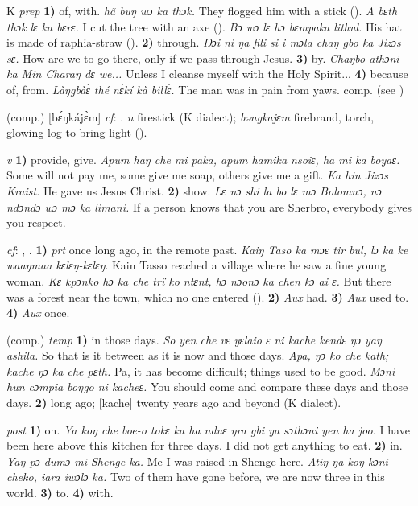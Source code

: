 \begin{letter}{K}
 \textit{prep} \textbf{1)} of, with. \textit{hã buŋ wɔ ka thɔk.} They flogged him with a stick (\citealt{Pichl1967}). \textit{A bɛth thɔk lɛ ka bɛrɛ.} I cut the tree with an axe (\citealt{Pichl1967}). \textit{Bɔ wɔ lɛ hɔ bɛmpaka lithul.} His hat is made of raphia-straw (\citealt{Pichl1967}). \textbf{2)} through. \textit{Ŋɔi ni ŋa fili si i mɔla chaŋ gbo ka Jizɔs sɛ.} How are we to go there, only if we pass through Jesus. \textbf{3)} by. \textit{Chaŋbo athɔni ka Min Charaŋ dɛ we...} Unless I cleanse myself with the Holy Spirit... \textbf{4)} because of, from. \textit{Làŋgbàɛ́ thé nɛ̀kí kà bìllɛ́.} The man was in pain from yaws. comp.  (see ) 

 (comp.) [bɛ́ŋkájɛ̀m] \textit{cf}: . \textit{n} firestick (K dialect); \textit{bəngkajɛm} firebrand, torch, glowing log to bring light (\citealt{Pichl1967}).

 \textit{v} \textbf{1)} provide, give. \textit{Apum haŋ che mi paka, apum hamika nsoiɛ, ha mi ka boyaɛ.} Some will not pay me, some give me soap, others give me a gift. \textit{Ka hin Jizɔs Kraist.} He gave us Jesus Christ. \textbf{2)} show. \textit{Lɛ nɔ shi la bo lɛ mɔ Bolomnɔ, nɔ ndɔndɔ wɔ mɔ ka limani.} If a person knows that you are Sherbro, everybody gives you respect.

 \textit{cf}: , . \textbf{1)} \textit{prt} once long ago, in the remote past. \textit{Kaiŋ Taso ka mɔɛ tir bul, lɔ ka ke waaŋmaa kɛlɛŋ-kɛlɛŋ}. Kain Tasso reached a village where he saw a fine young woman. \textit{Kɛ kpɔnko hɔ ka che trï ko ntɛnt, hɔ nɔonɔ ka chen kɔ ai ɛ.} But there was a forest near the town, which no one entered (\citealt{Pichl1967}). \textbf{2)} \textit{Aux} had. \textbf{3)} \textit{Aux} used to. \textbf{4)} \textit{Aux} once.

 (comp.) \textit{temp} \textbf{1)} in those days. \textit{So yen che vɛ yɛlaio ɛ ni kache kendɛ ŋɔ yaŋ ashila.} So that is it between as it is now and those days. \textit{Apa, ŋɔ ko che kath; kache ŋɔ ka che pɛth.} Pa, it has become difficult; things used to be good. \textit{Mɔni hun cɔmpia boŋgo ni kacheɛ.} You should come and compare these days and those days. \textbf{2)} long ago; [kache] twenty years ago and beyond (K dialect). 

 \textit{post} \textbf{1)} on. \textit{Ya koŋ che boe-o tokɛ ka ha nduɛ ŋra gbi ya sɔthɔni yen ha joo.} I have been here above this kitchen for three days. I did not get anything to eat. \textbf{2)} in. \textit{Yaŋ pɔ dumɔ mi Shenge ka.} Me I was raised in Shenge here. \textit{Atiŋ ŋa koŋ kɔni cheko, iara iwɔlɔ ka.} Two of them have gone before, we are now three in this world. \textbf{3)} to. \textbf{4)} with.


\end{letter}
